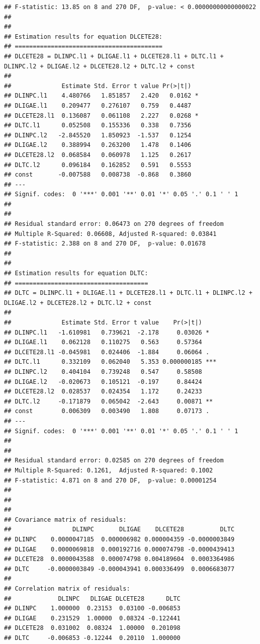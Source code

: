 \documentclass[
]{book}
\begin{document}
\begin{verbatim}
## F-statistic: 13.85 on 8 and 270 DF,  p-value: < 0.00000000000000022 
## 
## 
## Estimation results for equation DLCETE28: 
## ========================================= 
## DLCETE28 = DLINPC.l1 + DLIGAE.l1 + DLCETE28.l1 + DLTC.l1 + DLINPC.l2 + DLIGAE.l2 + DLCETE28.l2 + DLTC.l2 + const 
## 
##              Estimate Std. Error t value Pr(>|t|)  
## DLINPC.l1    4.480766   1.851857   2.420   0.0162 *
## DLIGAE.l1    0.209477   0.276107   0.759   0.4487  
## DLCETE28.l1  0.136087   0.061108   2.227   0.0268 *
## DLTC.l1      0.052508   0.155336   0.338   0.7356  
## DLINPC.l2   -2.845520   1.850923  -1.537   0.1254  
## DLIGAE.l2    0.388994   0.263200   1.478   0.1406  
## DLCETE28.l2  0.068584   0.060978   1.125   0.2617  
## DLTC.l2      0.096184   0.162852   0.591   0.5553  
## const       -0.007588   0.008738  -0.868   0.3860  
## ---
## Signif. codes:  0 '***' 0.001 '**' 0.01 '*' 0.05 '.' 0.1 ' ' 1
## 
## 
## Residual standard error: 0.06473 on 270 degrees of freedom
## Multiple R-Squared: 0.06608, Adjusted R-squared: 0.03841 
## F-statistic: 2.388 on 8 and 270 DF,  p-value: 0.01678 
## 
## 
## Estimation results for equation DLTC: 
## ===================================== 
## DLTC = DLINPC.l1 + DLIGAE.l1 + DLCETE28.l1 + DLTC.l1 + DLINPC.l2 + DLIGAE.l2 + DLCETE28.l2 + DLTC.l2 + const 
## 
##              Estimate Std. Error t value    Pr(>|t|)    
## DLINPC.l1   -1.610981   0.739621  -2.178     0.03026 *  
## DLIGAE.l1    0.062128   0.110275   0.563     0.57364    
## DLCETE28.l1 -0.045981   0.024406  -1.884     0.06064 .  
## DLTC.l1      0.332109   0.062040   5.353 0.000000185 ***
## DLINPC.l2    0.404104   0.739248   0.547     0.58508    
## DLIGAE.l2   -0.020673   0.105121  -0.197     0.84424    
## DLCETE28.l2  0.028537   0.024354   1.172     0.24233    
## DLTC.l2     -0.171879   0.065042  -2.643     0.00871 ** 
## const        0.006309   0.003490   1.808     0.07173 .  
## ---
## Signif. codes:  0 '***' 0.001 '**' 0.01 '*' 0.05 '.' 0.1 ' ' 1
## 
## 
## Residual standard error: 0.02585 on 270 degrees of freedom
## Multiple R-Squared: 0.1261,  Adjusted R-squared: 0.1002 
## F-statistic: 4.871 on 8 and 270 DF,  p-value: 0.00001254 
## 
## 
## 
## Covariance matrix of residuals:
##                 DLINPC       DLIGAE    DLCETE28          DLTC
## DLINPC    0.0000047185  0.000006982 0.000004359 -0.0000003849
## DLIGAE    0.0000069818  0.000192716 0.000074798 -0.0000439413
## DLCETE28  0.0000043588  0.000074798 0.004189604  0.0003364986
## DLTC     -0.0000003849 -0.000043941 0.000336499  0.0006683077
## 
## Correlation matrix of residuals:
##             DLINPC   DLIGAE DLCETE28      DLTC
## DLINPC    1.000000  0.23153  0.03100 -0.006853
## DLIGAE    0.231529  1.00000  0.08324 -0.122441
## DLCETE28  0.031002  0.08324  1.00000  0.201098
## DLTC     -0.006853 -0.12244  0.20110  1.000000
\end{verbatim}
\end{document}

